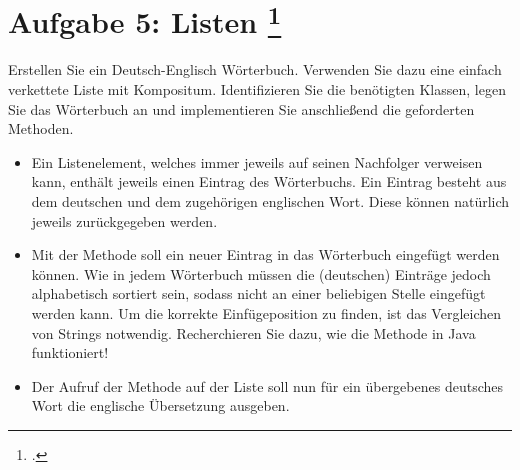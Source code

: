 \documentclass{bschlangaul-aufgabe}
\begin{document}

\section{Aufgabe 5: Listen
\footcite[Seite 4, Aufgabe 5]{aud:ab:5}
}

Erstellen Sie ein Deutsch-Englisch Wörterbuch. Verwenden Sie dazu eine
einfach verkettete Liste mit Kompositum. Identifizieren Sie die
benötigten Klassen, legen Sie das Wörterbuch an und implementieren Sie
anschließend die geforderten Methoden.

\begin{itemize}
\item Ein Listenelement, welches immer jeweils auf seinen Nachfolger
verweisen kann, enthält jeweils einen Eintrag des Wörterbuchs. Ein
Eintrag besteht aus dem deutschen und dem zugehörigen englischen Wort.
Diese können natürlich jeweils zurückgegeben werden.

\item Mit der Methode  soll ein neuer Eintrag in das Wörterbuch eingefügt werden
können. Wie in jedem Wörterbuch müssen die (deutschen) Einträge jedoch
alphabetisch sortiert sein, sodass nicht an einer beliebigen Stelle
eingefügt werden kann. Um die korrekte Einfügeposition zu finden, ist
das Vergleichen von Strings notwendig. Recherchieren Sie dazu, wie die
Methode  in Java funktioniert!

\item Der Aufruf der Methode  auf
der Liste soll nun für ein übergebenes deutsches Wort die englische
Übersetzung ausgeben.

\end{itemize}
\end{document}

